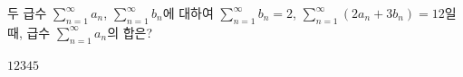 두 급수 $\displaystyle\sum_{n=1}^{\infty} a_n$, $\displaystyle\sum_{n=1}^{\infty} b_n$에 대하여 $\displaystyle\sum_{n=1}^{\infty} b_n=2$, $\displaystyle\sum_{n=1}^{\infty}(2a_n+3b_n)=12$일 때, 급수 $\displaystyle\sum_{n=1}^{\infty} a_n$의 합은?
\begin{choices32}{$1$}{$2$}{$3$}{$4$}{$5$}\end{choices32}
